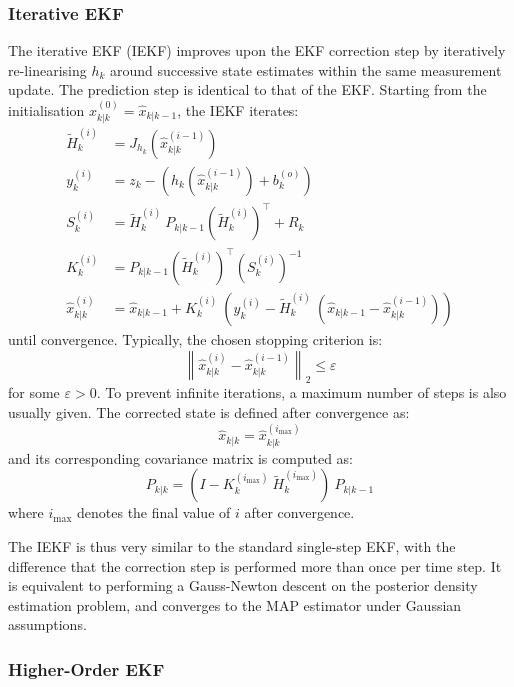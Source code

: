 \subsubsection{Iterative EKF}

The iterative EKF (IEKF) improves upon the EKF correction step by iteratively re-linearising $h_k$ around successive state estimates within the same measurement update. The prediction step is identical to that of the EKF. Starting from the initialisation $\hat{x}_{k|k}^{(0)}=\hat{x}_{k|k-1}$, the IEKF iterates:
\begin{align}
	\tilde{H}_k^{(i)}&=J_{h_k}\left(\hat{x}_{k|k}^{(i-1)}\right)\\
	y_k^{(i)}&=z_k-\left(h_k\left(\hat{x}_{k|k}^{(i-1)}\right)+b_k^{(o)}\right)\\
	S_k^{(i)}&=\tilde{H}_k^{(i)}\:P_{k|k-1}\left(\tilde{H}_k^{(i)}\right)^\top\!+R_k\\
	K_k^{(i)}&=P_{k|k-1}\left(\tilde{H}_k^{(i)}\right)^\top\left(S_k^{(i)}\right)^{-1}\\
	\hat{x}_{k|k}^{(i)}&=\hat{x}_{k|k-1}+K_k^{(i)}\:\left(y_k^{(i)}-\tilde{H}_k^{(i)}\:\left(\hat{x}_{k|k-1}-\hat{x}_{k|k}^{(i-1)}\right)
	\right)
\end{align}
until convergence. Typically, the chosen stopping criterion is:
\begin{equation}
	\left\|\hat{x}_{k|k}^{(i)}-\hat{x}_{k|k}^{(i-1)}\right\|_2\leq\varepsilon
\end{equation}
for some $\varepsilon>0$. To prevent infinite iterations, a maximum number of steps is also usually given. The corrected state is defined after convergence as:
\begin{equation}
	\hat{x}_{k|k}=\hat{x}_{k|k}^{(i_{\max})}
\end{equation}
and its corresponding covariance matrix is computed as:
\begin{equation}
	P_{k|k}=\left(I-K_k^{(i_{\max})}\:\tilde{H}_k^{(i_{\max})}\right)\:P_{k|k-1}
\end{equation}
where $i_{\max}$ denotes the final value of $i$ after convergence.

The IEKF is thus very similar to the standard single-step EKF, with the difference that the correction step is performed more than once per time step. It is equivalent to performing a Gauss-Newton descent on the posterior density estimation problem, and converges to the MAP estimator under Gaussian assumptions.

\subsubsection{Higher-Order EKF}

